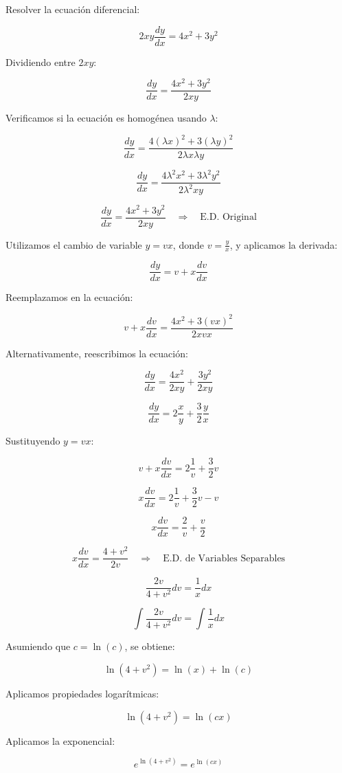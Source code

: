 Resolver la ecuación diferencial:

\[
2xy\frac{dy}{dx} = 4x^{2} + 3y^{2}
\]

Dividiendo entre \( 2xy \):

\[
\frac{dy}{dx} = \frac{4x^{2} + 3y^{2}}{2xy}
\]

Verificamos si la ecuación es homogénea usando \( \lambda \):

\[
\frac{dy}{dx} = \frac{4(\lambda x)^{2} + 3(\lambda y)^{2}}{2\lambda x \lambda y}
\]

\[
\frac{dy}{dx} = \frac{4\lambda^{2} x^{2} + 3\lambda^{2} y^{2}}{2\lambda^{2} xy}
\]

\[
\frac{dy}{dx} = \frac{4x^{2} + 3y^{2}}{2xy} \quad \Rightarrow \quad \text{E.D. Original}
\]

Utilizamos el cambio de variable \( y = vx \), donde \( v = \frac{y}{x} \), y aplicamos la derivada:

\[
\frac{dy}{dx} = v + x\frac{dv}{dx}
\]

Reemplazamos en la ecuación:

\[
v + x\frac{dv}{dx} = \frac{4x^{2} + 3(vx)^{2}}{2xvx}
\]

Alternativamente, reescribimos la ecuación:

\[
\frac{dy}{dx} = \frac{4x^{2}}{2xy} + \frac{3y^{2}}{2xy}
\]

\[
\frac{dy}{dx} = 2\frac{x}{y} + \frac{3}{2}\frac{y}{x}
\]

Sustituyendo \( y = vx \):

\[
v + x\frac{dv}{dx} = 2\frac{1}{v} + \frac{3}{2} v
\]

\[
x\frac{dv}{dx} = 2\frac{1}{v} + \frac{3}{2} v - v
\]

\[
x\frac{dv}{dx} = \frac{2}{v} + \frac{v}{2}
\]

\[
x\frac{dv}{dx} = \frac{4+v^{2}}{2v} \quad \Rightarrow \quad \text{E.D. de Variables Separables}
\]

\[
\frac{2v}{4+v^{2}} dv = \frac{1}{x} dx
\]

\[
\int \frac{2v}{4+v^{2}} dv = \int \frac{1}{x} dx
\]

Asumiendo que \( c = \ln(c) \), se obtiene:

\[
\ln(4+v^{2}) = \ln(x) + \ln(c)
\]

Aplicamos propiedades logarítmicas:

\[
\ln(4+v^{2}) = \ln(cx)
\]

Aplicamos la exponencial:

\[
e^{\ln(4+v^{2})} = e^{\ln(cx)}
\]

